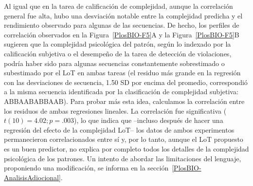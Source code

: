 
Al igual que en la tarea de calificación de complejidad, aunque la correlación general fue alta, hubo una desviación notable entre la complejidad predicha y el rendimiento observado para algunas de las secuencias. De hecho, los perfiles de correlación observados en la Figura~\ref{PlosBIO-F5}A y la Figura~\ref{PlosBIO-F5}B sugieren que la complejidad psicológica del patrón, según lo indexado por la calificación subjetiva o el desempeño de la tarea de detección de violaciones, podría haber sido para algunas secuencias constantemente sobrestimado o subestimado por el LoT en ambas tareas (el residuo más grande en la regresión con las desviaciones de secuencia, 1.50 SD por encima del promedio, correspondió a la misma secuencia identificada por la clasificación de complejidad subjetiva: ABBAABABBAAB). Para probar más esta idea, calculamos la correlación entre los residuos de ambas regresiones lineales. La correlación fue significativa ($t (10) = 4.02; p = .003$), lo que indica que --incluso después de hacer una regresión del efecto de la complejidad LoT-- los datos de ambos experimentos permanecieron correlacionados entre sí y, por lo tanto, aunque el LoT propuesto es un buen predictor, no explica por completo todos los detalles de la complejidad psicológica de los patrones. Un intento de abordar las limitaciones del lenguaje, proponiendo una modificación, se informa en la sección~\ref{PlosBIO-AnalisisAdiocional}.


